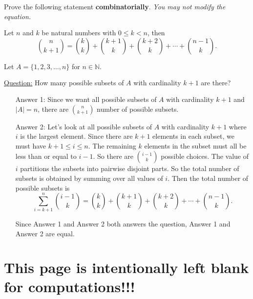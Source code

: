 \documentclass[10pt, addpoints]{exam}
\theoremstyle{definition}
\begin{document}
\begin{questions}
\begin{parts}
\end{parts}



\newpage
\question[8]
Prove the following statement {\bf combinatorially}. \textit{You may not modify the equation.}

Let $n$ and $k$ be natural numbers with $0\leq k<n$, then 
\[
\binom{n}{k+1} = \binom{k}{k} + \binom{k+1}{k} + \binom{k+2}{k} + \cdots + \binom{n-1}{k}.
\]

\begin{solution}
 Let $A = \{1, 2, 3, \dots, n\}$ for $n\in \mathbb{N}$. 
 
 \underline{Question:} How many possible subsets of $A$ with cardinality $k+1$ are there?
 
 \begin{itemize}
 \item[Answer 1:] Since we want all possible subsets of $A$ with cardinality $k+1$ and $|A|=n$, there are $\binom{n}{k+1}$ number of possible subsets.
 
 \item[Answer 2:] Let's look at all possible subsets of $A$ with cardinality $k+1$ where $i$ is the largest element. Since there are $k+1$ elements in each subset, we must have $k+1\leq i\leq n$. The remaining $k$ elements in the subset must all be less than or equal to $i-1$.  So there are $\binom{i-1}{k}$ possible choices.  The value of $i$ partitions the subsets into pairwise disjoint parts. So the total number of subsets is obtained by summing over all values of $i$. Then the total number of possible subsets is
 \[
 \displaystyle\sum_{i=k+1}^n \binom{i-1}{k} =  \binom{k}{k} + \binom{k+1}{k} + \binom{k+2}{k} + \cdots + \binom{n-1}{k}.
 \]
 
 Since Answer 1 and Answer 2 both answers the question, Answer 1 and Answer 2 are equal.
 \end{itemize}
\end{solution}


\end{questions}




%
\newpage
\section*{This page is intentionally left blank for computations!!!}
\end{document}
